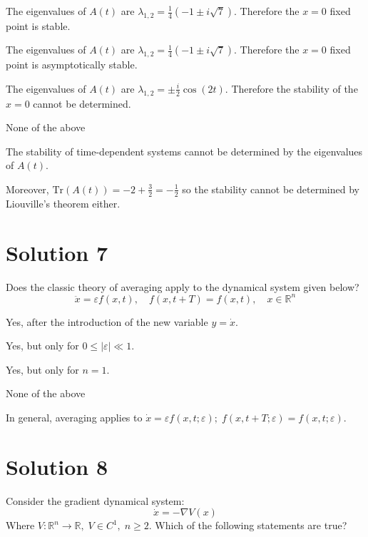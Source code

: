 \documentclass[twoside,10pt,a4paper]{article}
\begin{document}
\begin{enumerate}[label=(\alph*)]
	\item The eigenvalues of $A(t)$ are $\displaystyle \lambda_{1,2} = \frac{1}{4}(-1 \pm i\sqrt{7})$. Therefore the $x = 0$ fixed point is stable.
	\item The eigenvalues of $A(t)$ are $\displaystyle \lambda_{1,2} = \frac{1}{4}(-1 \pm i\sqrt{7})$. Therefore the $x = 0$ fixed point is asymptotically stable.
	\item The eigenvalues of $A(t)$ are $\displaystyle \lambda_{1,2} = \pm \frac{i}{2}\cos(2t)$. Therefore the stability of the $x = 0$ cannot be determined.
	{\color{MyRed}\item None of the above}
\end{enumerate}

{\color{MyRed} The stability of time-dependent systems cannot be determined by the eigenvalues of $A(t)$.

Moreover, $\text{Tr}(A(t)) = -2 + \frac{3}{2} = - \frac{1}{2}$ so the stability cannot be determined by Liouville's theorem either.}

\section*{Solution 7}
Does the classic theory of averaging apply to the dynamical system given below?
\begin{equation*}
	\ddot{x} = \varepsilon f(x,t), \quad f(x, t + T) = f(x,t), \quad x \in \mathbb{R}^n
\end{equation*}

\begin{enumerate}[label=(\alph*)]
	\item Yes, after the introduction of the new variable $y = \dot{x}$.
	\item Yes, but only for $ 0 \leq |\varepsilon| \ll 1 $.
	\item Yes, but only for $n = 1$.
	{\color{MyRed}\item None of the above}
\end{enumerate}

{\color{MyRed}In general, averaging applies to $\dot{x} = \varepsilon f(x,t; \varepsilon); \; f(x,t+T; \varepsilon) = f(x,t;\varepsilon)$.
}

\section*{Solution 8}
Consider the gradient dynamical system:
\begin{equation*}
	\dot{x} = -\nabla V(x)
\end{equation*}
Where $V: \mathbb{R}^n \longrightarrow \mathbb{R}, \; V \in C^1, \; n \geq 2$. Which of the following statements are true?
\end{document}

